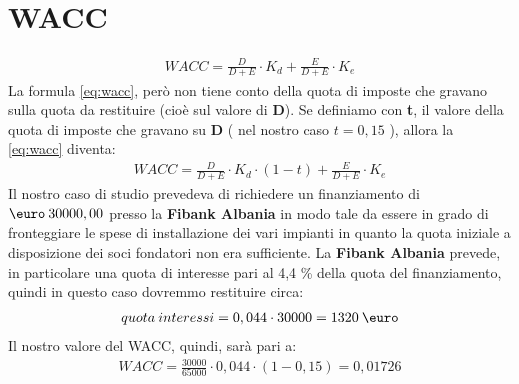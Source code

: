 \section[WACC]{WACC}
	\begin{equation}
	\label{eq:wacc}
	\begin{split}
		WACC = \frac{D}{D+E} \cdot K_d + \frac{E}{D+E} \cdot K_e 
	\end{split}
	\end{equation}
	La formula \ref{eq:wacc}, però non tiene conto della quota di imposte che gravano sulla quota da restituire (cioè sul valore di \textbf{D}). \newline Se definiamo con \textbf{t}, il valore della quota di imposte che gravano su \textbf{D} ( nel nostro caso $ t = 0,15 $ ), allora la \ref{eq:wacc} diventa:
	\begin{equation}
	\label{eq:wacc_tax}
	\begin{split}
		WACC = \frac{D}{D+E} \cdot K_d \cdot ( 1 - t ) + \frac{E}{D+E} \cdot K_e 
	\end{split}
	\end{equation}	
	Il nostro caso di studio prevedeva di richiedere un finanziamento di $\mbox{\euro} \: 30000,00$ presso la \textbf{\ac{Fibank Albania}} in modo tale da essere in grado di fronteggiare le spese di installazione dei vari impianti in quanto la quota iniziale a disposizione dei soci fondatori non era sufficiente.
\newline
La \textbf{\ac{Fibank Albania}} prevede, in particolare una quota di interesse pari al 4,4 \% della quota del finanziamento, quindi in questo caso dovremmo restituire circa:
	\begin{equation}
	\label{eq:interessi_fibank}
	\begin{split}
		quota \: interessi = 0,044 \cdot 30000 = 1320 \:\mbox{\euro} 
	\end{split}
	\end{equation}	
Il nostro valore del \ac{WACC}, quindi, sarà pari a:
	\begin{equation}
	\label{eq:wacc_tax_value}
	\begin{split}
		WACC = \frac{30000}{65000} \cdot 0,044 \cdot ( 1 - 0,15 ) = 0,01726 
	\end{split}
	\end{equation}